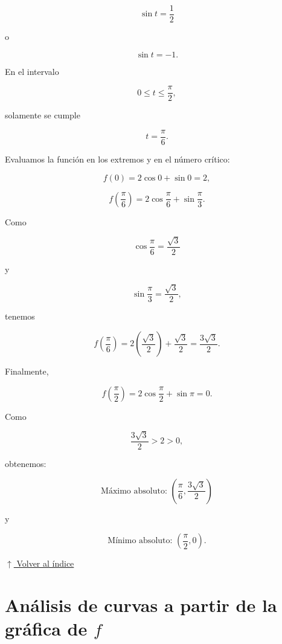 \documentclass[12pt]{article}
\newcommand{\volverindice}{%
    \vspace{1em}%
    \begin{flushright}%
        \hyperlink{indice}{\small $\uparrow$ Volver al índice}%
    \end{flushright}%
}
\begin{document}
\begin{enumerate}[label=\alph*.-]
\begin{enumerate}[label=\roman*.-]
    \[
    \sin t=\frac12
    \]

    o

    \[
    \sin t=-1.
    \]

    En el intervalo

    \[
    0\leq t\leq\frac{\pi}{2},
    \]

    solamente se cumple

    \[
    t=\frac{\pi}{6}.
    \]

    Evaluamos la función en los extremos y en el número crítico:

    \[
    f(0)
    =
    2\cos0+\sin0
    =
    2,
    \]

    \[
    f\left(\frac{\pi}{6}\right)
    =
    2\cos\frac{\pi}{6}
    +
    \sin\frac{\pi}{3}.
    \]

    Como

    \[
    \cos\frac{\pi}{6}=\frac{\sqrt3}{2}
    \]

    y

    \[
    \sin\frac{\pi}{3}=\frac{\sqrt3}{2},
    \]

    tenemos

    \[
    f\left(\frac{\pi}{6}\right)
    =
    2\left(\frac{\sqrt3}{2}\right)
    +
    \frac{\sqrt3}{2}
    =
    \frac{3\sqrt3}{2}.
    \]

    Finalmente,

    \[
    f\left(\frac{\pi}{2}\right)
    =
    2\cos\frac{\pi}{2}
    +
    \sin\pi
    =
    0.
    \]

    Como

    \[
    \frac{3\sqrt3}{2}>2>0,
    \]

    obtenemos:

    \[
    \boxed{
    \text{Máximo absoluto: }
    \left(
    \frac{\pi}{6},
    \frac{3\sqrt3}{2}
    \right)
    }
    \]

    y

    \[
    \boxed{
    \text{Mínimo absoluto: }
    \left(
    \frac{\pi}{2},
    0
    \right)
    }.
    \]

\end{enumerate}

\end{enumerate}

\volverindice
\newpage


\newpage

\section{Análisis de curvas a partir de la gráfica de \texorpdfstring{$f$}{f}}
\end{document}
